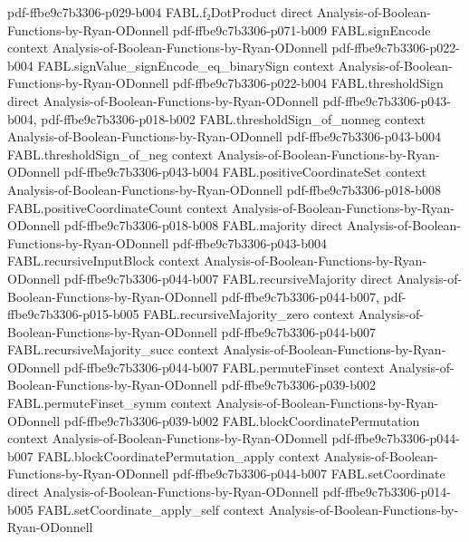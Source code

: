\begin{theorem}
  {pdf-ffbe9c7b3306-p029-b004}
\proofstep
  {FABL.f₂DotProduct}
  {direct}
  {Analysis-of-Boolean-Functions-by-Ryan-ODonnell}
  {pdf-ffbe9c7b3306-p071-b009}
\proofstep
  {FABL.signEncode}
  {context}
  {Analysis-of-Boolean-Functions-by-Ryan-ODonnell}
  {pdf-ffbe9c7b3306-p022-b004}
\proofstep
  {FABL.signValue_signEncode_eq_binarySign}
  {context}
  {Analysis-of-Boolean-Functions-by-Ryan-ODonnell}
  {pdf-ffbe9c7b3306-p022-b004}
\proofstep
  {FABL.thresholdSign}
  {direct}
  {Analysis-of-Boolean-Functions-by-Ryan-ODonnell}
  {pdf-ffbe9c7b3306-p043-b004,
    pdf-ffbe9c7b3306-p018-b002}
\proofstep
  {FABL.thresholdSign_of_nonneg}
  {context}
  {Analysis-of-Boolean-Functions-by-Ryan-ODonnell}
  {pdf-ffbe9c7b3306-p043-b004}
\proofstep
  {FABL.thresholdSign_of_neg}
  {context}
  {Analysis-of-Boolean-Functions-by-Ryan-ODonnell}
  {pdf-ffbe9c7b3306-p043-b004}
\proofstep
  {FABL.positiveCoordinateSet}
  {context}
  {Analysis-of-Boolean-Functions-by-Ryan-ODonnell}
  {pdf-ffbe9c7b3306-p018-b008}
\proofstep
  {FABL.positiveCoordinateCount}
  {context}
  {Analysis-of-Boolean-Functions-by-Ryan-ODonnell}
  {pdf-ffbe9c7b3306-p018-b008}
\proofstep
  {FABL.majority}
  {direct}
  {Analysis-of-Boolean-Functions-by-Ryan-ODonnell}
  {pdf-ffbe9c7b3306-p043-b004}
\proofstep
  {FABL.recursiveInputBlock}
  {context}
  {Analysis-of-Boolean-Functions-by-Ryan-ODonnell}
  {pdf-ffbe9c7b3306-p044-b007}
\proofstep
  {FABL.recursiveMajority}
  {direct}
  {Analysis-of-Boolean-Functions-by-Ryan-ODonnell}
  {pdf-ffbe9c7b3306-p044-b007,
    pdf-ffbe9c7b3306-p015-b005}
\proofstep
  {FABL.recursiveMajority_zero}
  {context}
  {Analysis-of-Boolean-Functions-by-Ryan-ODonnell}
  {pdf-ffbe9c7b3306-p044-b007}
\proofstep
  {FABL.recursiveMajority_succ}
  {context}
  {Analysis-of-Boolean-Functions-by-Ryan-ODonnell}
  {pdf-ffbe9c7b3306-p044-b007}
\proofstep
  {FABL.permuteFinset}
  {context}
  {Analysis-of-Boolean-Functions-by-Ryan-ODonnell}
  {pdf-ffbe9c7b3306-p039-b002}
\proofstep
  {FABL.permuteFinset_symm}
  {context}
  {Analysis-of-Boolean-Functions-by-Ryan-ODonnell}
  {pdf-ffbe9c7b3306-p039-b002}
\proofstep
  {FABL.blockCoordinatePermutation}
  {context}
  {Analysis-of-Boolean-Functions-by-Ryan-ODonnell}
  {pdf-ffbe9c7b3306-p044-b007}
\proofstep
  {FABL.blockCoordinatePermutation_apply}
  {context}
  {Analysis-of-Boolean-Functions-by-Ryan-ODonnell}
  {pdf-ffbe9c7b3306-p044-b007}
\proofstep
  {FABL.setCoordinate}
  {direct}
  {Analysis-of-Boolean-Functions-by-Ryan-ODonnell}
  {pdf-ffbe9c7b3306-p014-b005}
\proofstep
  {FABL.setCoordinate_apply_self}
  {context}
  {Analysis-of-Boolean-Functions-by-Ryan-ODonnell}

\end{theorem}
